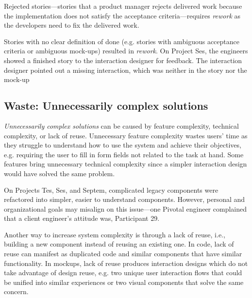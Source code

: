 
Rejected stories---stories that a product manager rejects delivered work because the implementation does not satisfy the acceptance criteria---requires \textit{rework} as the developers need to fix the delivered work.

Stories with no clear definition of done (e.g. stories with ambiguous acceptance criteria or ambiguous mock-ups) resulted in \textit{rework}. On Project Ses, the engineers showed a finished story to the interaction designer for feedback. The interaction designer pointed out a missing interaction, which was neither in the story nor the mock-up

\subsection{Waste: Unnecessarily complex solutions}
\textit{Unnecessarily complex solutions} can be caused by feature complexity, technical complexity, or lack of reuse. Unnecessary feature complexity wastes users' time as they struggle to understand how to use the system and achieve their objectives, e.g. requiring the user to fill in form fields not related to the task at hand. Some features bring unnecessary technical complexity since a simpler interaction design would have solved the same problem. %

On Projects Tes, Ses, and Septem, complicated legacy components were refactored into simpler, easier to understand components. However, personal and organizational goals may misalign on this issue---one Pivotal engineer complained that a client engineer's attitude was,  \textemdash Participant 29.

Another way to increase system complexity is through a lack of reuse, i.e., building a new component instead of reusing an existing one. In code, lack of reuse can manifest as duplicated code and similar components that have similar functionality. In mockups, lack of reuse produces  interaction designs which do not take advantage of design reuse, e.g. two unique user interaction flows that could be unified into similar experiences or two visual components that solve the same concern.

